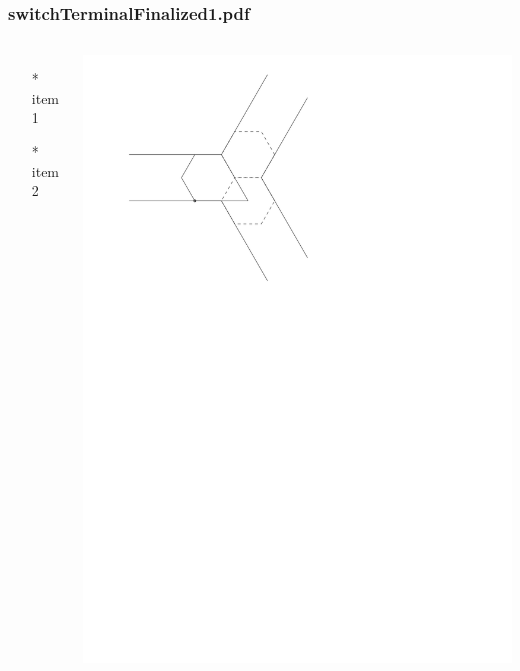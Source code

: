 \begin{frame} \frametitle{switchTerminalFinalized1.pdf}
    \begin{columns}[c]
        \begin{itemize}
            \item[*] item 1
            \item[*] item 2
        \end{itemize}
        \begin{minipage}{\linewidth}
            \begin{center}
            \includegraphics[width=.9\textwidth]{graphics/switchTerminalFinalized1.pdf}
            \label{gfx:switchTerminalFinalized1.pdf}
            \end{center}
        \end{minipage}
    \end{columns}
\end{frame}
